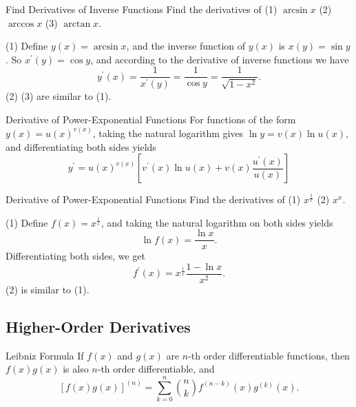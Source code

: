 \begin{example}{Find Derivatives of Inverse Functions}{}
  Find the derivatives of
  (1) $\arcsin x$ (2) $\arccos x$ (3) $\arctan x$.
\end{example}

\begin{solution}
  (1) Define $y(x) = \arcsin x$, and the inverse function of $y(x)$ is
  $x(y) = \sin y$. So $x^{\prime}(y) = \cos y$, and according to the derivative
  of inverse functions we have
  \begin{equation}
    y^{\prime}(x) = \frac{1}{x^{\prime}(y)} = \frac{1}{\cos y} = \frac{1}{\sqrt{1 - x^2}}.
  \end{equation}
  (2) (3) are similar to (1).
\end{solution}

\begin{proposition}{Derivative of Power-Exponential Functions}{}
  For functions of the form $y(x) = u(x)^{v(x)}$,
  taking the natural logarithm gives $\ln y = v(x) \ln u(x)$,
  and differentiating both sides yields
  \begin{equation}
    y^{\prime}=u(x)^{v(x)}\left[v^{\prime}(x)\ln u(x)+v(x)\frac{u^{\prime}(x)}{u(x)}\right]
  \end{equation}
\end{proposition}

\begin{example}{Derivative of Power-Exponential Functions}{}
  Find the derivatives of (1) $x^{\frac{1}{x}}$
  (2) $x^x$.
\end{example}

\begin{solution}
  (1) Define $f(x) = x^{\frac{1}{x}}$, and
  taking the natural logarithm on both sides yields
  \begin{equation}
    \ln f(x) = \frac{\ln x}{x}.
  \end{equation}
  Differentiating both sides, we get
  \begin{equation}
    f^{\prime}(x) = x^{\frac{1}{x}} \frac{1 - \ln x}{x^2}.
  \end{equation}
  (2) is similar to (1).
\end{solution}

\subsection{Higher-Order Derivatives}

\begin{proposition}{Leibniz Formula}{}
  If $f(x)$ and $g(x)$ are $n$-th order differentiable functions,
  then $f(x)g(x)$ is also $n$-th order differentiable, and
  \begin{equation}
    \left[ f(x)g(x) \right]^{(n)} = \sum\limits_{k = 0}^n \binom{n}{k} f^{(n-k)}(x) g^{(k)}(x).
  \end{equation}
\end{proposition}

